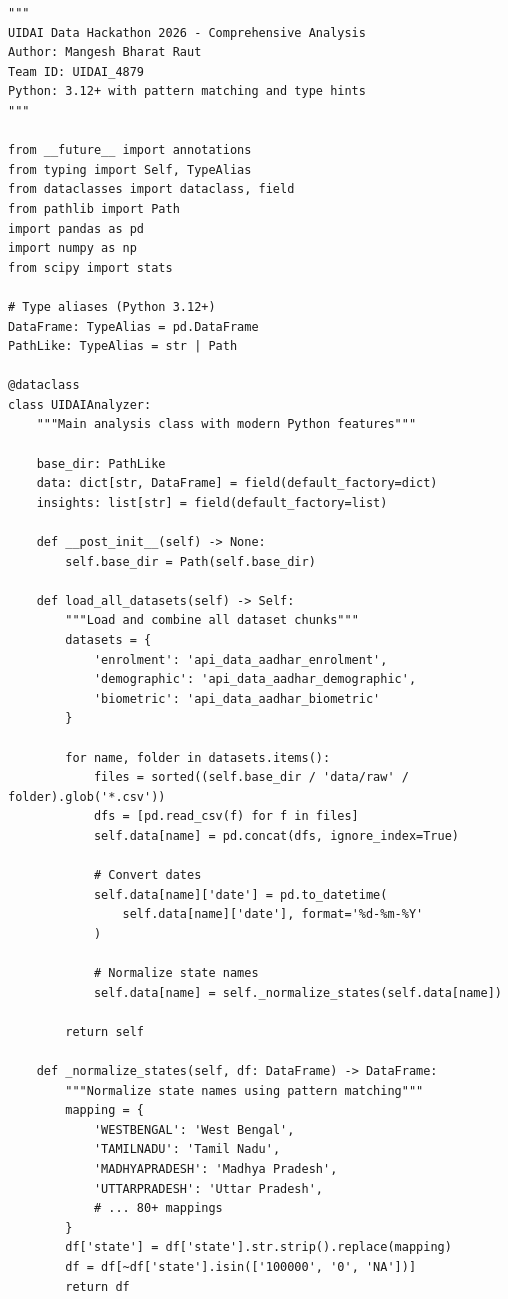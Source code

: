 \documentclass[12pt,a4paper]{article}
\begin{document}
\begin{lstlisting}[caption={UIDAIAnalyzer - Main Analysis Class}]
"""
UIDAI Data Hackathon 2026 - Comprehensive Analysis
Author: Mangesh Bharat Raut
Team ID: UIDAI_4879
Python: 3.12+ with pattern matching and type hints
"""

from __future__ import annotations
from typing import Self, TypeAlias
from dataclasses import dataclass, field
from pathlib import Path
import pandas as pd
import numpy as np
from scipy import stats

# Type aliases (Python 3.12+)
DataFrame: TypeAlias = pd.DataFrame
PathLike: TypeAlias = str | Path

@dataclass
class UIDAIAnalyzer:
    """Main analysis class with modern Python features"""
    
    base_dir: PathLike
    data: dict[str, DataFrame] = field(default_factory=dict)
    insights: list[str] = field(default_factory=list)
    
    def __post_init__(self) -> None:
        self.base_dir = Path(self.base_dir)
        
    def load_all_datasets(self) -> Self:
        """Load and combine all dataset chunks"""
        datasets = {
            'enrolment': 'api_data_aadhar_enrolment',
            'demographic': 'api_data_aadhar_demographic',
            'biometric': 'api_data_aadhar_biometric'
        }
        
        for name, folder in datasets.items():
            files = sorted((self.base_dir / 'data/raw' / folder).glob('*.csv'))
            dfs = [pd.read_csv(f) for f in files]
            self.data[name] = pd.concat(dfs, ignore_index=True)
            
            # Convert dates
            self.data[name]['date'] = pd.to_datetime(
                self.data[name]['date'], format='%d-%m-%Y'
            )
            
            # Normalize state names
            self.data[name] = self._normalize_states(self.data[name])
            
        return self
    
    def _normalize_states(self, df: DataFrame) -> DataFrame:
        """Normalize state names using pattern matching"""
        mapping = {
            'WESTBENGAL': 'West Bengal',
            'TAMILNADU': 'Tamil Nadu',
            'MADHYAPRADESH': 'Madhya Pradesh',
            'UTTARPRADESH': 'Uttar Pradesh',
            # ... 80+ mappings
        }
        df['state'] = df['state'].str.strip().replace(mapping)
        df = df[~df['state'].isin(['100000', '0', 'NA'])]
        return df
\end{lstlisting}
\end{document}
